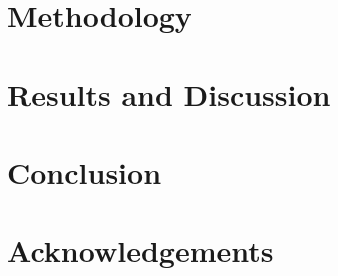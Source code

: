\documentclass{pv_phd}
\begin{document}





\chapter{Methodology}
\blindtext[5] %

\chapter{Results and Discussion}
\blindtext[7] %

\chapter{Conclusion}
\blindtext[3] %

\chapter*{Acknowledgements}
\thispagestyle{empty}
\blindtext[1] %

\clearpage


\clearpage
\end{document}
